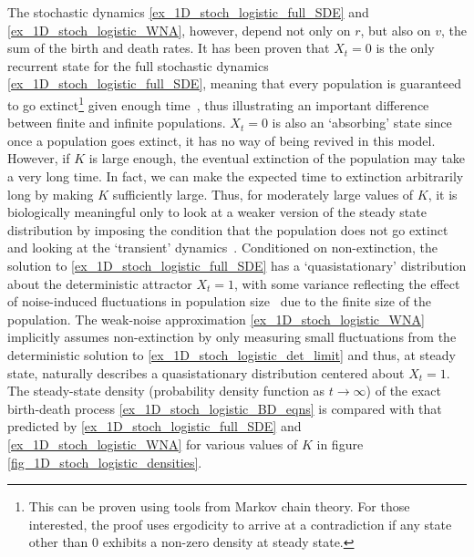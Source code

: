 The stochastic dynamics \eqref{ex_1D_stoch_logistic_full_SDE} and \eqref{ex_1D_stoch_logistic_WNA}, however, depend not only on $r$, but also on $v$, the sum of the birth and death rates. It has been proven that $X_t = 0$ is the only recurrent state for the full stochastic dynamics \eqref{ex_1D_stoch_logistic_full_SDE}, meaning that every population is guaranteed to go extinct\footnote{This can be proven using tools from Markov chain theory. For those interested, the proof uses ergodicity to arrive at a contradiction if any state other than $0$ exhibits a non-zero density at steady state.} given enough time~\citep{nasell_extinction_2001}, thus illustrating an important difference between finite and infinite populations. $X_t = 0$ is also an `absorbing' state since once a population goes extinct, it has no way of being revived in this model. However, if $K$ is large enough, the eventual extinction of the population may take a very long time. In fact, we can make the expected time to extinction arbitrarily long by making $K$ sufficiently large. Thus, for moderately large values of $K$, it is biologically meaningful only to look at a weaker version of the steady state distribution by imposing the condition that the population does not go extinct and looking at the `transient' dynamics~\citep{hastings_transients_2004}.
Conditioned on non-extinction, the solution to \eqref{ex_1D_stoch_logistic_full_SDE} has a `quasistationary' distribution about the deterministic attractor $X_t = 1$, with some variance reflecting the effect of noise-induced fluctuations in population size~\citep{nasell_extinction_2001} due to the finite size of the population. The weak-noise approximation \eqref{ex_1D_stoch_logistic_WNA} implicitly assumes non-extinction by only measuring small fluctuations from the deterministic solution to \eqref{ex_1D_stoch_logistic_det_limit} and thus, at steady state, naturally describes a quasistationary distribution centered about $X_t = 1$. The steady-state density (probability density function as $t \to \infty$) of the exact birth-death process \eqref{ex_1D_stoch_logistic_BD_eqns} is compared with that predicted by \eqref{ex_1D_stoch_logistic_full_SDE} and \eqref{ex_1D_stoch_logistic_WNA} for various values of $K$ in figure \ref{fig_1D_stoch_logistic_densities}.

